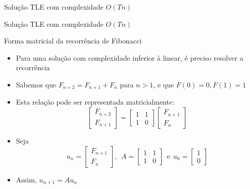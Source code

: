 \begin{frame}[fragile]{Solução TLE com complexidade $O(Tn)$}
\end{frame}

\begin{frame}[fragile]{Solução TLE com complexidade $O(Tn)$}
\end{frame}

\begin{frame}[fragile]{Forma matricial da recorrência de Fibonacci}

    \begin{itemize}
        \item Para uma solução com complexidade inferior à linear, é preciso resolver a 
            recorrência

        \item Sabemos que $F_{n + 2} = F_{n + 1} + F_{n}$ para $n > 1$, e que $F(0) = 0, F(1) = 1$

        \item Esta relação pode ser representada matricialmente:
        \[
            \begin{bmatrix} F_{n + 2} \\ F_{n + 1}\end{bmatrix} = 
            \begin{bmatrix} 1 & 1 \\ 1 & 0\end{bmatrix}
            \begin{bmatrix} F_{n + 1} \\ F_{n}\end{bmatrix}
        \]

        \item Seja
        \[
            u_n = \begin{bmatrix} F_{n + 1} \\ F_{n}\end{bmatrix},\ \ 
            A = \begin{bmatrix} 1 & 1 \\ 1 & 0\end{bmatrix}\ \ \mbox{e}\ \ 
            u_0 = \begin{bmatrix} 1 \\ 0\end{bmatrix}
        \]

        \item Assim, $u_{n + 1} = Au_n$
    \end{itemize}

\end{frame}

